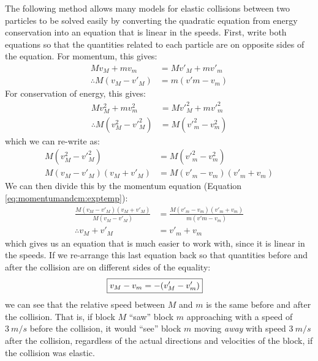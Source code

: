 \begin{example}
The following method allows many models for elastic collisions between two particles to be solved easily by converting the quadratic equation from energy conservation into an equation that is linear in the speeds. First, write both equations so that the quantities related to each particle are on opposite sides of the equation. For momentum, this gives:
\begin{align}
\label{eq:momentumandcm:exptemp}
Mv_M+mv_m&=Mv'_M+mv'_m\nonumber\\
\therefore M(v_M-v'_M) &= m(v'm-v_m)
\end{align}
For conservation of energy, this gives:
\begin{align*}
Mv_M^2+mv_m^2&=Mv'^2_M+mv'^2_m\\
\therefore  M(v_M^2-v'^2_M)&= M(v'^2_m-v^2_m)
\end{align*}
which we can re-write as:
\begin{align*}
M(v_M^2-v'^2_M)&= M(v'^2_m-v^2_m)\\
M(v_M-v'_M)(v_M+v'_M)&= M(v'_m-v_m)(v'_m+v_m)
\end{align*}
We can then divide this by the momentum equation (Equation \ref{eq:momentumandcm:exptemp}):
\begin{align*}
\frac{M(v_M-v'_M)(v_M+v'_M)}{M(v_M-v'_M)}&= \frac{M(v'_m-v_m)(v'_m+v_m)}{m(v'm-v_m)}\\
\therefore v_M+v'_M&=v'_m+v_m
\end{align*}
which gives us an equation that is much easier to work with, since it is linear in the speeds. If we re-arrange this last equation back so that quantities before and after the collision are on different sides of the equality:
\begin{align*}
\Aboxed{v_M-v_m &= - (v'_M-v'_m)}
\end{align*}
we can see that the relative speed between $M$ and $m$ is the same before and after the collision. That is, if block $M$ ``saw'' block $m$ approaching with a speed of $\SI{3}{m/s}$ before the collision, it would ``see'' block $m$ moving \textit{away} with speed $\SI{3}{m/s}$ after the collision, regardless of the actual directions and velocities of the block, if the collision was elastic.


\end{example}
